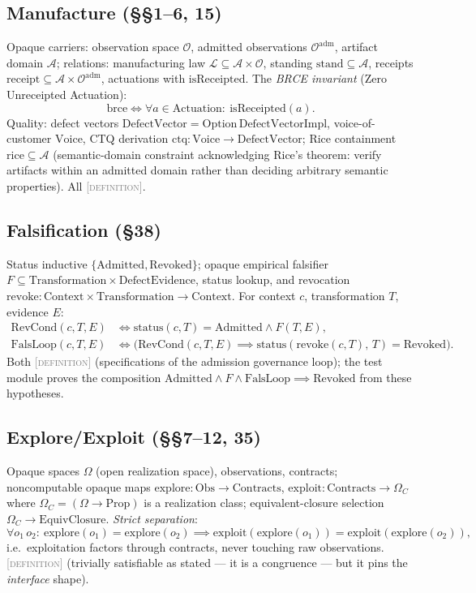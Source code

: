 \documentclass[11pt]{article}
\newcommand{\DEFINITION}{\textcolor{gray}{\textsc{[definition]}}}
\theoremstyle{plain}
\theoremstyle{definition}
\begin{document}
\subsection{Manufacture (\S\S1--6, 15)}
Opaque carriers: observation space $\mathcal{O}$, admitted observations
$\mathcal{O}^{\mathrm{adm}}$, artifact domain $\mathcal{A}$; relations:
manufacturing law $\mathcal{L} \subseteq \mathcal{A} \times \mathcal{O}$,
standing $\mathrm{stand} \subseteq \mathcal{A}$, receipts
$\mathrm{receipt} \subseteq \mathcal{A} \times \mathcal{O}^{\mathrm{adm}}$,
actuations with $\mathrm{isReceipted}$. The \emph{BRCE invariant} (Zero
Unreceipted Actuation):
\[
  \mathrm{brce} \iff \forall a \in \mathrm{Actuation}:\ \mathrm{isReceipted}(a).
\]
Quality: defect vectors $\mathrm{DefectVector} = \mathrm{Option}\,
\mathrm{DefectVectorImpl}$, voice-of-customer $\mathrm{Voice}$, CTQ
derivation $\mathrm{ctq} : \mathrm{Voice} \to \mathrm{DefectVector}$;
Rice containment $\mathrm{rice} \subseteq \mathcal{A}$ (semantic-domain
constraint acknowledging Rice's theorem: verify artifacts within an admitted
domain rather than deciding arbitrary semantic properties). All
\DEFINITION.

\subsection{Falsification (\S38)}
Status inductive $\{\mathrm{Admitted}, \mathrm{Revoked}\}$; opaque empirical
falsifier $F \subseteq \mathrm{Transformation} \times
\mathrm{DefectEvidence}$, status lookup, and revocation
$\mathrm{revoke} : \mathrm{Context} \times \mathrm{Transformation} \to
\mathrm{Context}$. For context $c$, transformation $T$, evidence $E$:
\begin{align*}
  \mathrm{RevCond}(c, T, E) &\iff
    \mathrm{status}(c, T) = \mathrm{Admitted} \wedge F(T, E), \\
  \mathrm{FalsLoop}(c, T, E) &\iff
    \big(\mathrm{RevCond}(c,T,E) \implies
    \mathrm{status}(\mathrm{revoke}(c,T),\, T) = \mathrm{Revoked}\big).
\end{align*}
Both \DEFINITION{} (specifications of the admission governance loop);
the test module proves the composition
$\mathrm{Admitted} \wedge F \wedge \mathrm{FalsLoop} \implies
\mathrm{Revoked}$ from these hypotheses.

\subsection{Explore/Exploit (\S\S7--12, 35)}
Opaque spaces $\Omega$ (open realization space), observations, contracts;
noncomputable opaque maps
$\mathrm{explore} : \mathrm{Obs} \to \mathrm{Contracts}$,
$\mathrm{exploit} : \mathrm{Contracts} \to \Omega_C$ where
$\Omega_C = (\Omega \to \mathrm{Prop})$ is a realization class;
equivalent-closure selection $\Omega_C \to \mathrm{EquivClosure}$.
\emph{Strict separation}:
\[
  \forall o_1\, o_2:\ \mathrm{explore}(o_1) = \mathrm{explore}(o_2)
  \implies \mathrm{exploit}(\mathrm{explore}(o_1))
         = \mathrm{exploit}(\mathrm{explore}(o_2)),
\]
i.e.\ exploitation factors through contracts, never touching raw
observations. \DEFINITION{} (trivially satisfiable as stated --- it is a
congruence --- but it pins the \emph{interface} shape).
\end{document}
